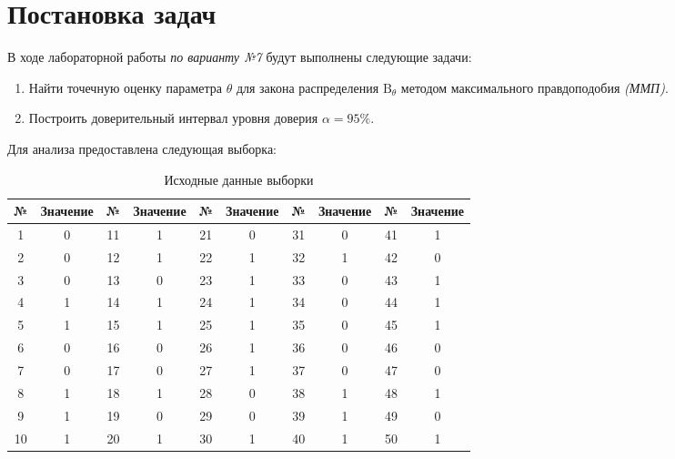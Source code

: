 \section{Постановка задач}

В ходе лабораторной работы \textit{по варианту №7} будут выполнены следующие задачи:

\begin{enumerate}
  \item Найти точечную оценку параметра \( \theta \) для закона распределения \( \textrm{B}_\theta \) методом максимального правдоподобия \textit{(ММП)}.
  \item Построить доверительный интервал уровня доверия \( \alpha = 95\% \).
\end{enumerate}

Для анализа предоставлена следующая выборка:

\begin{table}[h!]
\centering
\begin{tabular}{|c|c||c|c||c|c||c|c||c|c|}
\hline
№ & Значение & № & Значение & № & Значение & № & Значение & № & Значение \\ \hline \hline
1  & 0 & 11 & 1 & 21 & 0 & 31 & 0 & 41 & 1 \\ \hline
2  & 0 & 12 & 1 & 22 & 1 & 32 & 1 & 42 & 0 \\ \hline
3  & 0 & 13 & 0 & 23 & 1 & 33 & 0 & 43 & 1 \\ \hline
4  & 1 & 14 & 1 & 24 & 1 & 34 & 0 & 44 & 1 \\ \hline
5  & 1 & 15 & 1 & 25 & 1 & 35 & 0 & 45 & 1 \\ \hline
6  & 0 & 16 & 0 & 26 & 1 & 36 & 0 & 46 & 0 \\ \hline
7  & 0 & 17 & 0 & 27 & 1 & 37 & 0 & 47 & 0 \\ \hline
8  & 1 & 18 & 1 & 28 & 0 & 38 & 1 & 48 & 1 \\ \hline
9  & 1 & 19 & 0 & 29 & 0 & 39 & 1 & 49 & 0 \\ \hline
10 & 1 & 20 & 1 & 30 & 1 & 40 & 1 & 50 & 1 \\ \hline
\end{tabular}
\caption{Исходные данные выборки}
\end{table}
